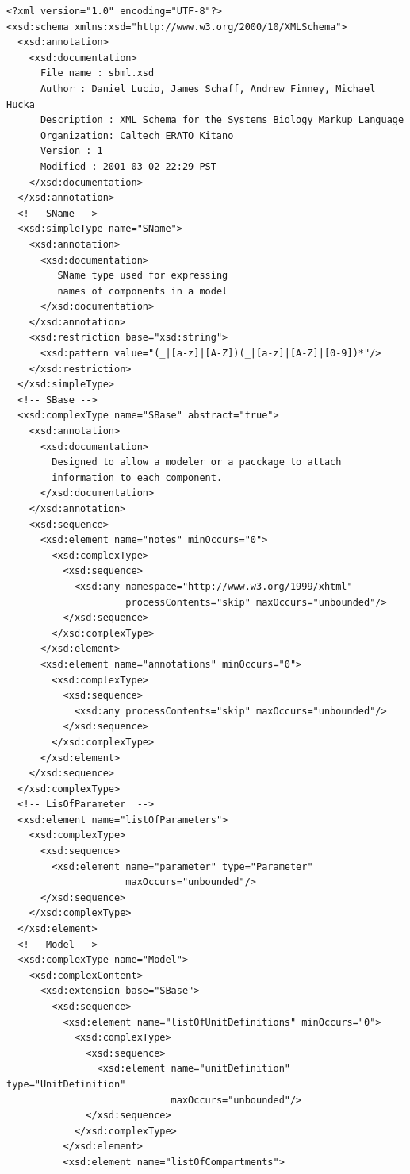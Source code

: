 \documentclass[10pt]{cekarticle}
\begin{document}
\begin{small}
\tightspacing
\begin{verbatim}
<?xml version="1.0" encoding="UTF-8"?>
<xsd:schema xmlns:xsd="http://www.w3.org/2000/10/XMLSchema">
  <xsd:annotation>
    <xsd:documentation> 
      File name : sbml.xsd
      Author : Daniel Lucio, James Schaff, Andrew Finney, Michael Hucka
      Description : XML Schema for the Systems Biology Markup Language
      Organization: Caltech ERATO Kitano
      Version : 1
      Modified : 2001-03-02 22:29 PST
    </xsd:documentation>
  </xsd:annotation>
  <!-- SName -->
  <xsd:simpleType name="SName">
    <xsd:annotation>
      <xsd:documentation>
         SName type used for expressing
         names of components in a model
      </xsd:documentation>
    </xsd:annotation>
    <xsd:restriction base="xsd:string">
      <xsd:pattern value="(_|[a-z]|[A-Z])(_|[a-z]|[A-Z]|[0-9])*"/>
    </xsd:restriction>
  </xsd:simpleType>
  <!-- SBase -->
  <xsd:complexType name="SBase" abstract="true">
    <xsd:annotation>
      <xsd:documentation>
        Designed to allow a modeler or a pacckage to attach
        information to each component.
      </xsd:documentation>
    </xsd:annotation>
    <xsd:sequence>
      <xsd:element name="notes" minOccurs="0">
        <xsd:complexType>
          <xsd:sequence>
            <xsd:any namespace="http://www.w3.org/1999/xhtml"
                     processContents="skip" maxOccurs="unbounded"/>
          </xsd:sequence>
        </xsd:complexType>
      </xsd:element>
      <xsd:element name="annotations" minOccurs="0">
        <xsd:complexType>
          <xsd:sequence>
            <xsd:any processContents="skip" maxOccurs="unbounded"/>
          </xsd:sequence>
        </xsd:complexType>
      </xsd:element>
    </xsd:sequence>
  </xsd:complexType>
  <!-- LisOfParameter  -->
  <xsd:element name="listOfParameters">
    <xsd:complexType>
      <xsd:sequence>
        <xsd:element name="parameter" type="Parameter"
                     maxOccurs="unbounded"/>
      </xsd:sequence>
    </xsd:complexType>
  </xsd:element>
  <!-- Model -->
  <xsd:complexType name="Model">
    <xsd:complexContent>
      <xsd:extension base="SBase">
        <xsd:sequence>
          <xsd:element name="listOfUnitDefinitions" minOccurs="0">
            <xsd:complexType>
              <xsd:sequence>
                <xsd:element name="unitDefinition" type="UnitDefinition"
                             maxOccurs="unbounded"/>
              </xsd:sequence>
            </xsd:complexType>
          </xsd:element>
          <xsd:element name="listOfCompartments">

\end{verbatim}
\end{small}
\end{document}
